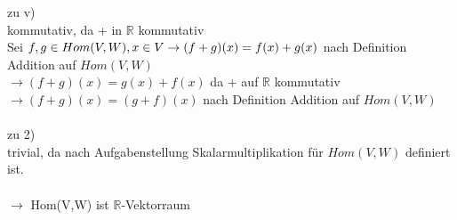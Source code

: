 \noindent zu v)\\
kommutativ, da + in $\mathbb{R}$ kommutativ\\
Sei $f,g \in Hom(V,W), x \in V\\
\rightarrow (f + g)(x) = f(x) + g(x)$ nach Definition Addition auf $Hom(V,W)$\\
$\rightarrow (f + g)(x) = g(x) + f(x)$ da + auf $\mathbb{R}$ kommutativ\\
$\rightarrow (f + g)(x) = (g + f)(x)$ nach Definition Addition auf $Hom(V,W)$\\\\
zu 2)\\
trivial, da nach Aufgabenstellung Skalarmultiplikation f\"ur $Hom(V,W)$ definiert ist.\\\\
$\rightarrow$ Hom(V,W) ist $\mathbb{R}$-Vektorraum
